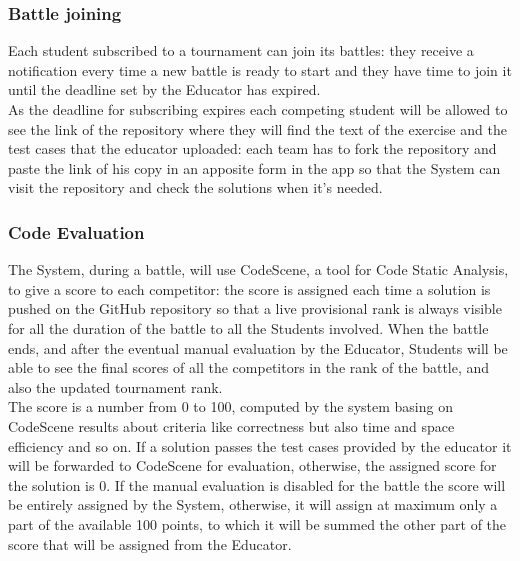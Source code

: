 \documentclass{article}
\begin{document}
\subsubsection{Battle joining}
Each student subscribed to a tournament can join its battles: they receive a notification every time a new battle is ready to start and they have time to join it until the deadline set by the Educator has expired.\\
As the deadline for subscribing expires each competing student will be allowed to see the link of the repository where they will find the text of the exercise and the test cases that the educator uploaded: each team has to fork the repository and paste the link of his copy in an apposite form in the app so that the System can visit the repository and check the solutions when it's needed.
\subsubsection{Code Evaluation}
The System, during a battle, will use CodeScene, a tool for Code Static Analysis, to give a score to each competitor: the score is assigned each time a solution is pushed on the GitHub repository so that a live provisional rank is always visible for all the duration of the battle to all the Students involved. 
When the battle ends, and after the eventual manual evaluation by the Educator, Students will be able to see the final scores of all the competitors in the rank of the battle, and also the updated tournament rank.\\
The score is a number from 0 to 100, computed by the system basing on CodeScene results about criteria like correctness but also time and space efficiency and so on.
If a solution passes the test cases provided by the educator it will be forwarded to CodeScene for evaluation, otherwise, the assigned score for the solution is 0.
If the manual evaluation is disabled for the battle the score will be entirely assigned by the System, otherwise, it will assign at maximum only a part of the available 100 points, to which it will be summed the other part of the score that will be assigned from the Educator.
\end{document}
